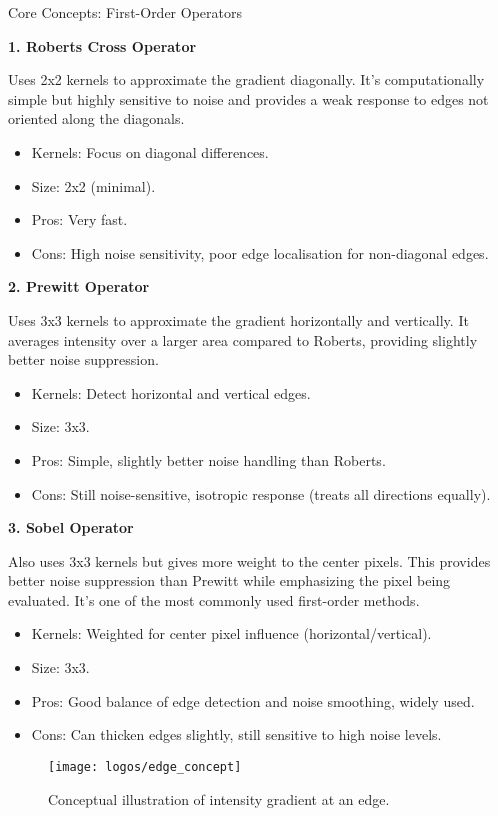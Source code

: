 \documentclass[final]{beamer}
\newlength{\colwidth}
\begin{document}
\begin{frame}[t]
\begin{columns}[t]
\begin{column}{\colwidth}
  \begin{block}{Core Concepts: First-Order Operators}

    \textbf{1. Roberts Cross Operator} \par
    Uses 2x2 kernels to approximate the gradient diagonally. It's computationally simple but highly sensitive to noise and provides a weak response to edges not oriented along the diagonals.
    \begin{itemize}
        \item Kernels: Focus on diagonal differences.
        \item Size: 2x2 (minimal).
        \item Pros: Very fast.
        \item Cons: High noise sensitivity, poor edge localisation for non-diagonal edges.
    \end{itemize}

    \textbf{2. Prewitt Operator} \par
    Uses 3x3 kernels to approximate the gradient horizontally and vertically. It averages intensity over a larger area compared to Roberts, providing slightly better noise suppression.
     \begin{itemize}
        \item Kernels: Detect horizontal and vertical edges.
        \item Size: 3x3.
        \item Pros: Simple, slightly better noise handling than Roberts.
        \item Cons: Still noise-sensitive, isotropic response (treats all directions equally).
    \end{itemize}

    \textbf{3. Sobel Operator} \par
    Also uses 3x3 kernels but gives more weight to the center pixels. This provides better noise suppression than Prewitt while emphasizing the pixel being evaluated. It's one of the most commonly used first-order methods.
     \begin{itemize}
        \item Kernels: Weighted for center pixel influence (horizontal/vertical).
        \item Size: 3x3.
        \item Pros: Good balance of edge detection and noise smoothing, widely used.
        \item Cons: Can thicken edges slightly, still sensitive to high noise levels.
    \end{itemize}
     \begin{figure}
       \centering
       \texttt{[image: logos/edge\_concept]} %
       \caption{Conceptual illustration of intensity gradient at an edge.}
       \label{fig:edge_concept}
     \end{figure}
  \end{block}


\end{column}
\end{columns}
\end{frame}
\end{document}
